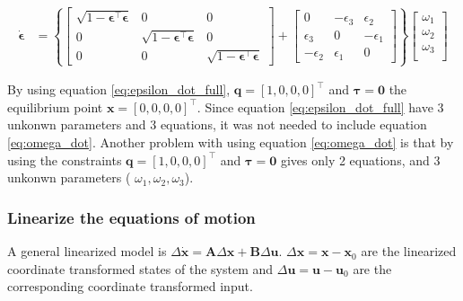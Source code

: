 \begin{equation}
    \begin{aligned}
	\dot{\boldsymbol{\epsilon}}
	&= 
	\left \{
	\begin{bmatrix}
		\sqrt{1-\boldsymbol{\epsilon}^\top \boldsymbol{\epsilon}} & 0 &  0  \\
		0 & \sqrt{1-\boldsymbol{\epsilon}^\top \boldsymbol{\epsilon}} &   0   \\
		0 &  0  & \sqrt{1-\boldsymbol{\epsilon}^\top \boldsymbol{\epsilon}} 
	\end{bmatrix}
	+
	\begin{bmatrix}
		0 & -\epsilon_3 &  \epsilon_2   \\
		\epsilon_3 & 0 &   - \epsilon_1   \\
		-\epsilon_2 &  \epsilon_1  & 0
	\end{bmatrix}
	\right \} 
	\begin{bmatrix}
		\omega_1  \\
		\omega_2  \\
		\omega_3  \\
	\end{bmatrix}
	\end{aligned}
	\label{eq:epsilon_dot_full}
\end{equation}

By using equation \eqref{eq:epsilon_dot_full},   $\mathbf{q} = [1, 0, 0, 0]^\top$ and $\boldsymbol{\tau} = \boldsymbol{0}$ the equilibrium point $\mathbf{x} = [0, 0, 0, 0]^\top$. Since equation \eqref{eq:epsilon_dot_full} have 3 unkonwn parameters and 3 equations, it was not needed to include equation \eqref{eq:omega_dot}. Another problem with using equation \eqref{eq:omega_dot} is that by using the constraints  $\mathbf{q} = [1, 0, 0, 0]^\top$ and $\boldsymbol{\tau} = \boldsymbol{0}$ gives only 2 equations, and 3 unkonwn parameters ( $\omega_1, \omega_2, \omega_3$).


\subsubsection*{Linearize the equations of motion}

A general linearized model is $ \Delta \dot{\mathbf{x}} = \mathbf{A} \Delta \mathbf{x} + \mathbf{B} \Delta \mathbf{u}$. $\Delta \mathbf{x} = \mathbf{x} - \mathbf{x}_0$ are the linearized coordinate transformed states of the system and $\Delta \mathbf{u} = \mathbf{u} - \mathbf{u}_0$ are the corresponding coordinate transformed input. 

